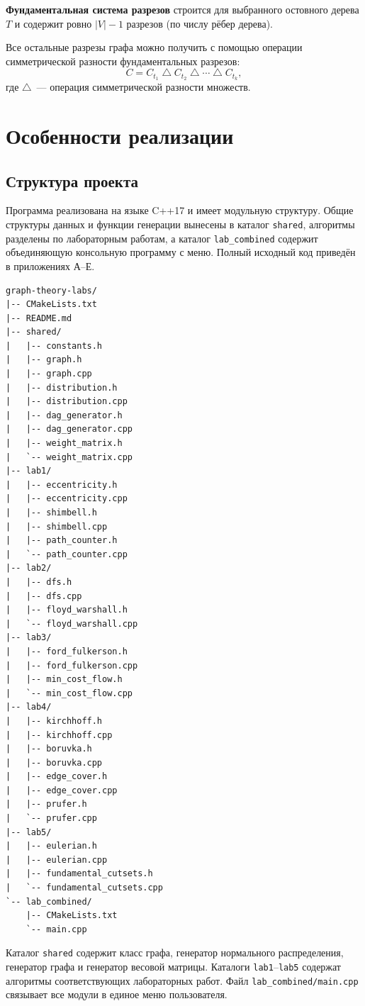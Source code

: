 \documentclass[a4paper,final]{article}
\begin{document}
\textbf{Фундаментальная система разрезов} строится для выбранного остовного дерева $T$ и содержит ровно $|V|-1$ разрезов (по числу рёбер дерева).

Все остальные разрезы графа можно получить с помощью операции симметрической разности фундаментальных разрезов:
\[
C = C_{t_1} \mathbin{\triangle} C_{t_2} \mathbin{\triangle} \cdots \mathbin{\triangle} C_{t_k},
\]
где $\triangle$~--- операция симметрической разности множеств.

\clearpage
\section{Особенности реализации}

\subsection{Структура проекта}

Программа реализована на языке C++17 и имеет модульную структуру. Общие структуры данных и функции генерации вынесены в каталог \texttt{shared}, алгоритмы разделены по лабораторным работам, а каталог \texttt{lab\_combined} содержит объединяющую консольную программу с меню. Полный исходный код приведён в приложениях А--Е.

\begin{lstlisting}[caption={Структура проекта}, label={lst:project-structure}]
graph-theory-labs/
|-- CMakeLists.txt
|-- README.md
|-- shared/
|   |-- constants.h
|   |-- graph.h
|   |-- graph.cpp
|   |-- distribution.h
|   |-- distribution.cpp
|   |-- dag_generator.h
|   |-- dag_generator.cpp
|   |-- weight_matrix.h
|   `-- weight_matrix.cpp
|-- lab1/
|   |-- eccentricity.h
|   |-- eccentricity.cpp
|   |-- shimbell.h
|   |-- shimbell.cpp
|   |-- path_counter.h
|   `-- path_counter.cpp
|-- lab2/
|   |-- dfs.h
|   |-- dfs.cpp
|   |-- floyd_warshall.h
|   `-- floyd_warshall.cpp
|-- lab3/
|   |-- ford_fulkerson.h
|   |-- ford_fulkerson.cpp
|   |-- min_cost_flow.h
|   `-- min_cost_flow.cpp
|-- lab4/
|   |-- kirchhoff.h
|   |-- kirchhoff.cpp
|   |-- boruvka.h
|   |-- boruvka.cpp
|   |-- edge_cover.h
|   |-- edge_cover.cpp
|   |-- prufer.h
|   `-- prufer.cpp
|-- lab5/
|   |-- eulerian.h
|   |-- eulerian.cpp
|   |-- fundamental_cutsets.h
|   `-- fundamental_cutsets.cpp
`-- lab_combined/
    |-- CMakeLists.txt
    `-- main.cpp
\end{lstlisting}

Каталог \texttt{shared} содержит класс графа, генератор нормального распределения, генератор графа и генератор весовой матрицы. Каталоги \texttt{lab1}--\texttt{lab5} содержат алгоритмы соответствующих лабораторных работ. Файл \texttt{lab\_combined/main.cpp} связывает все модули в единое меню пользователя.
\end{document}
